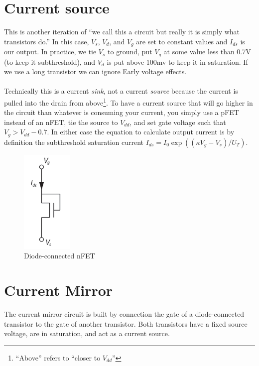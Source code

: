 \section{Current source}
This is another iteration of ``we call this a circuit but really it is simply what transistors do.'' In this case, $V_s$, $V_d$, and $V_g$ are set to constant values and $I_{ds}$ is our output. In practice, we tie $V_s$ to ground, put $V_g$ at some value less than 0.7V (to keep it subthreshold), and $V_d$ is put above 100mv to keep it in saturation. If we use a long transistor we can ignore Early voltage effects.\\ \\
Technically this is a current \emph{sink}, not a current \emph{source} because the current is pulled into the drain from above\footnote{``Above'' refers to ``closer to $V_{dd}$''}. To have a current source that will go higher in the circuit than whatever is consuming your current, you simply use a pFET instead of an nFET, tie the source to $V_{dd}$, and set gate voltage such that $V_g > V_{dd} - 0.7$. In either case the equation to calculate output current is by definition the subthreshold saturation current $I_{ds} = I_0 \exp ( (\kappa V_g - V_s)/U_T )$.
\begin{figure}[ht]
 \centering
\includegraphics[natwidth=185,natheight=375]{pics/nme_diodeConn_transistor.pdf}
\caption{Diode-connected nFET \label{diodeConn}}
\end{figure}



\section{Current Mirror}
The current mirror circuit is built by connection the gate of a diode-connected transistor to the gate of another transistor.
Both transistors have a fixed source voltage, are in saturation, and act as a current source.


